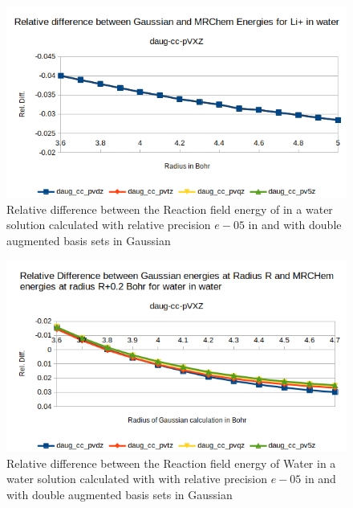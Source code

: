 \documentclass[../master_thesis.tex]{subfiles}
\begin{document}
\begin{figure}[!htb]
  \centering
  \includegraphics[width=\linewidth]{img/lipdaugreldiff.png}
  \caption{Relative difference between the Reaction field energy of in a water solution calculated with relative precision $e-05$ in \mrchem
  and with double augmented basis sets in Gaussian}
  \label{fig:lipreldiffdaug}
\end{figure}



\begin{figure}[!htb]
  \centering
    \includegraphics[width=\linewidth]{img/watdaugreldiff02.png}
  \caption{Relative difference between the Reaction field energy of Water in a water solution calculated with with relative precision $e-05$ in \mrchem
  and with double augmented basis sets in Gaussian}
  \label{fig:watreldiff02daug}
\end{figure}
\end{document}
